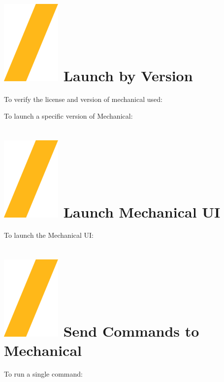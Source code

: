 \documentclass[9pt,landscape]{article}
\begin{document}
\begin{multicols}{3}
\section{\includegraphics[height=\fontcharht\font`\S]{slash.png} Launch by Version}

To verify the license and version of mechanical used:


To launch a specific version of Mechanical:






\section{\includegraphics[height=\fontcharht\font`\S]{slash.png} Launch  Mechanical UI}

To launch the  Mechanical UI:


\vfill

\section{\includegraphics[height=\fontcharht\font`\S]{slash.png} Send Commands to Mechanical}
To run a single command:


\end{multicols}
\end{document}
